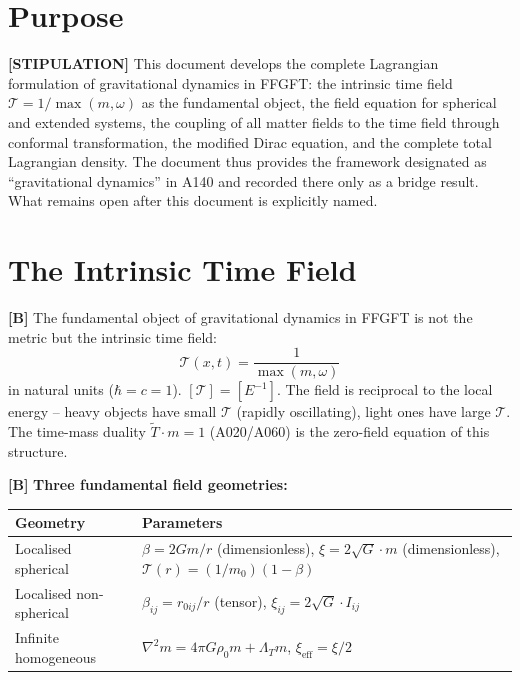 \section{Purpose}

\textbf{[STIPULATION]} This document develops the complete Lagrangian formulation
of gravitational dynamics in FFGFT: the intrinsic time field
$\mathcal T=1/\max(m,\omega)$ as the fundamental object, the field equation for
spherical and extended systems, the coupling of all matter fields to the time
field through conformal transformation, the modified Dirac equation, and the
complete total Lagrangian density. The document thus provides the framework
designated as ``gravitational dynamics'' in A140 and recorded there only as a
bridge result. What remains open after this document is explicitly named.

\section{The Intrinsic Time Field}

\textbf{[B]} The fundamental object of gravitational dynamics in FFGFT is not the
metric but the intrinsic time field:
\[
  \boxed{\;\mathcal T(x,t) = \frac{1}{\max(m,\omega)}\;}
\]
in natural units ($\hbar=c=1$). $[\mathcal T]=[E^{-1}]$. The field is reciprocal
to the local energy -- heavy objects have small $\mathcal T$ (rapidly oscillating),
light ones have large $\mathcal T$. The time-mass duality $\tilde T\cdot m=1$
(A020/A060) is the zero-field equation of this structure.

\textbf{[B]} \textbf{Three fundamental field geometries:}

\begin{center}
\renewcommand{\arraystretch}{1.3}
{\small
\begin{tabular}{ll}
\toprule
Geometry & Parameters \\
\midrule
Localised spherical &
  $\beta=2Gm/r$ (dimensionless), $\xi=2\sqrt G\cdot m$ (dimensionless),
  $\mathcal T(r)=(1/m_0)(1-\beta)$ \\
Localised non-spherical &
  $\beta_{ij}=r_{0ij}/r$ (tensor), $\xi_{ij}=2\sqrt G\cdot I_{ij}$ \\
Infinite homogeneous &
  $\nabla^2 m=4\pi G\rho_0 m+\Lambda_T m$, $\xi_\text{eff}=\xi/2$ \\
\bottomrule
\end{tabular}
}
\renewcommand{\arraystretch}{1.0}
\end{center}

